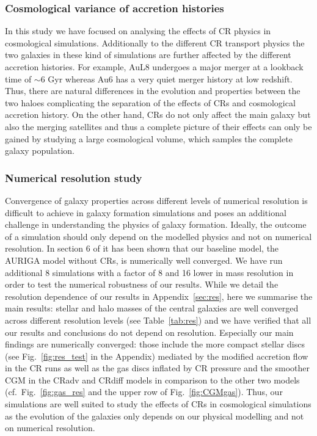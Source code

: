 \documentclass[useAMS,usenatbib]{mnras}
\begin{document}
\subsubsection{Cosmological variance of accretion histories}
In this study we have focused on analysing the effects of CR physics in cosmological simulations. Additionally to the different CR transport physics the two galaxies in these kind of simulations are further affected by the different accretion histories. For example, AuL8 undergoes a major merger at a lookback time of $\sim6$ Gyr whereas Au6 has a very quiet merger history at low redshift. Thus, there are natural differences in the evolution and properties between the two haloes complicating the separation of the effects of CRs and cosmological accretion history. On the other hand, CRs do not only affect the main galaxy but also the merging satellites and thus a complete picture of their effects can only be gained by studying a large cosmological volume, which samples the complete galaxy population.

\subsubsection{Numerical resolution study}
Convergence of galaxy properties across different levels of numerical resolution is difficult to achieve in galaxy formation simulations and poses an additional challenge in understanding the physics of galaxy formation. Ideally, the outcome of a simulation should only depend on the modelled physics and not on numerical resolution. In section 6 of \citet{Grand2017} it has been shown that our baseline model, the AURIGA model without CRs, is numerically well converged. We have run additional 8 simulations with a factor of 8 and 16 lower in mass resolution in order to test the numerical robustness of our results. While we detail the resolution dependence of our results in Appendix~\ref{sec:res}, here we summarise the main results: stellar and halo masses of the central galaxies are well converged across different resolution levels (see Table~\ref{tab:res}) and we have verified that all our results and conclusions do not depend on resolution. Especially our main findings are numerically converged: those include the more compact stellar discs (see Fig.~\ref{fig:res_test} in the Appendix) mediated by the modified accretion flow in the CR runs as well as the gas discs inflated by CR pressure and the smoother CGM in the CRadv and CRdiff models in comparison to the other two models (cf.\ Fig.~\ref{fig:gas_res} and the upper row of Fig.~\ref{fig:CGMgas}). Thus, our simulations are well suited to study the effects of CRs in cosmological simulations as the evolution of the galaxies only depends on our physical modelling and not on numerical resolution.
\end{document}
